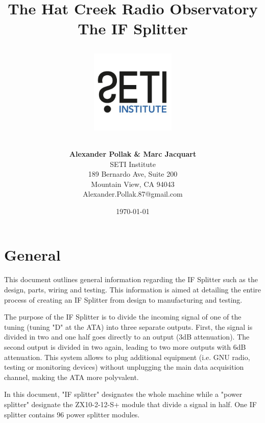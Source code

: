 \documentclass[12pt,a4paper,oneside]{article}
\title{\Huge The Hat Creek Radio Observatory\\
\vspace{0.5cm}
The IF Splitter\\
\vspace{0.5cm}
\normalsize \emph{}
\vspace{3.5cm}
\begin{center}
\includegraphics[height=4cm]{titlepage/SETI_institute_logo.jpg}
\end{center}
}
\author{ 
\vspace{1cm}
\Large
\textbf{ Alexander Pollak \& Marc Jacquart} \\
SETI Institute \\ 
189 Bernardo Ave, Suite 200 \\
Mountain View, CA 94043 \\ 
Alexander.Pollak.87@gmail.com\\
}
\date{\today}
\begin{document}
\clearpage\maketitle
\thispagestyle{empty}

%



%

\newpage

\section{General}
\label{sec:General}

This document outlines general information regarding the IF Splitter such as the design, parts, wiring and testing. This information is aimed at detailing the entire process of creating an IF Splitter from design to manufacturing and testing. 

The purpose of the IF Splitter is to divide the incoming signal of one of the tuning (tuning "D" at the ATA) into three separate outputs. First, the signal is divided in two and one half goes directly to an output (3dB attenuation). The second output is divided in two again, leading to two more outputs with 6dB attenuation. This system allows to plug additional equipment (i.e. GNU radio, testing or monitoring devices) without unplugging the main data acquisition channel, making the ATA more polyvalent.

In this document, "IF splitter" designates the whole machine while a "power splitter" designate the ZX10-2-12-S+ module that divide a signal in half. One IF splitter contains 96 power splitter modules.
\end{document}
